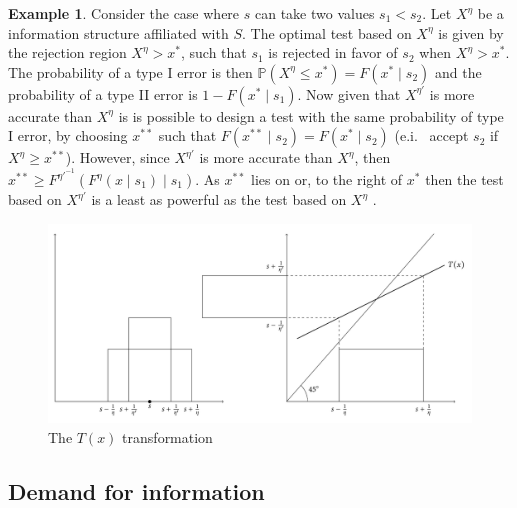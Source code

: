 \documentclass[10pt,a4paper]{article} %
\theoremstyle{definition}
\newtheorem{example}{Example}[section]
\theoremstyle{remark}
\begin{document}
\begin{example}
Consider the case where $s$ can take two values $s_{1}<s_{2}$. Let $X^{\eta}$ be a information structure affiliated with $S$. The optimal test based on $X^{\eta}$ is given by the rejection region $X^{\eta}>x^{*}$, such that $s_{1}$ is rejected in favor of $s_{2}$ when $X^{\eta}>x^{*}$. The probability of a type I error is then $\mathbb{P}(X^{\eta}\le x^{*})=F(x^{*}\mid s_{2})$ and the probability of a type II error is $1-F(x^{*}\mid s_{1})$. Now given that $X^{\eta'}$ is more accurate than $X^{\eta}$ is is possible to design a test with the same probability of type I error, by choosing $x^{**}$ such that $F(x^{**}\mid s_{2})=F(x^{*}\mid s_{2})$ (e.i. \ accept $s_{2}$ if $X^{\eta}\ge x^{**}$). However, since $X^{\eta'}$ is more accurate than $X^{\eta}$, then $x^{**}\ge F^{\eta'^{-1}}(F^{\eta}(x\mid s_{1})\mid s_{1})$. As $x^{**}$ lies on or, to the right of $x^{*}$ then the test based on $X^{\eta'}$ is a least as powerful as the test based on $X^{\eta}$
\citep{Lehmann1988,Persico2000}.

\begin{figure}
\includegraphics[width=\textwidth]{fig/t-transformation.pdf}
\protect\caption{The $T(x)$ transformation}
\end{figure}

\end{example}


\subsection{Demand for information}
\end{document}
